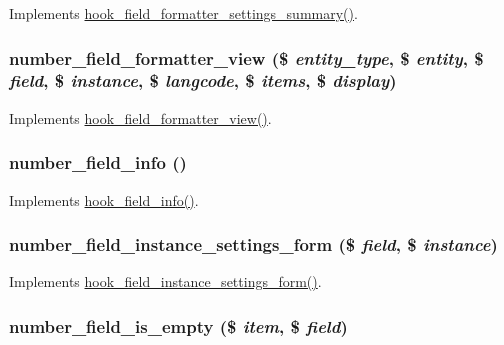 \label{number_8module_afe760de9ebf67e8e5f715ff7da247c32}
Implements \hyperlink{group__field__types_ga0cdef0fb8588dde07292df1b86f06d81}{hook\_\-field\_\-formatter\_\-settings\_\-summary()}. \hypertarget{number_8module_a5146f1692cf2227d54c62325a4ed7241}{
\subsubsection[{number\_\-field\_\-formatter\_\-view}]{\setlength{\rightskip}{0pt plus 5cm}number\_\-field\_\-formatter\_\-view (\$ {\em entity\_\-type}, \/  \$ {\em entity}, \/  \$ {\em field}, \/  \$ {\em instance}, \/  \$ {\em langcode}, \/  \$ {\em items}, \/  \$ {\em display})}}
\label{number_8module_a5146f1692cf2227d54c62325a4ed7241}
Implements \hyperlink{group__field__formatter_gaa588d99481fa147a1c88416e55fdfad6}{hook\_\-field\_\-formatter\_\-view()}. \hypertarget{number_8module_a5fbb6714145eaaa5efde9359d032bd50}{
\subsubsection[{number\_\-field\_\-info}]{\setlength{\rightskip}{0pt plus 5cm}number\_\-field\_\-info ()}}
\label{number_8module_a5fbb6714145eaaa5efde9359d032bd50}
Implements \hyperlink{group__field__types_gad3eb779f26f41b520f19af011ece3eb1}{hook\_\-field\_\-info()}. \hypertarget{number_8module_ad0d09477b1f2d0a143491ef5739d4b13}{
\subsubsection[{number\_\-field\_\-instance\_\-settings\_\-form}]{\setlength{\rightskip}{0pt plus 5cm}number\_\-field\_\-instance\_\-settings\_\-form (\$ {\em field}, \/  \$ {\em instance})}}
\label{number_8module_ad0d09477b1f2d0a143491ef5739d4b13}
Implements \hyperlink{group__field__types_gacce0ff92e36c0054ad131d95e576a13a}{hook\_\-field\_\-instance\_\-settings\_\-form()}. \hypertarget{number_8module_a111e78cb87246af587a6266b3c001f0b}{
\subsubsection[{number\_\-field\_\-is\_\-empty}]{\setlength{\rightskip}{0pt plus 5cm}number\_\-field\_\-is\_\-empty (\$ {\em item}, \/  \$ {\em field})}}
